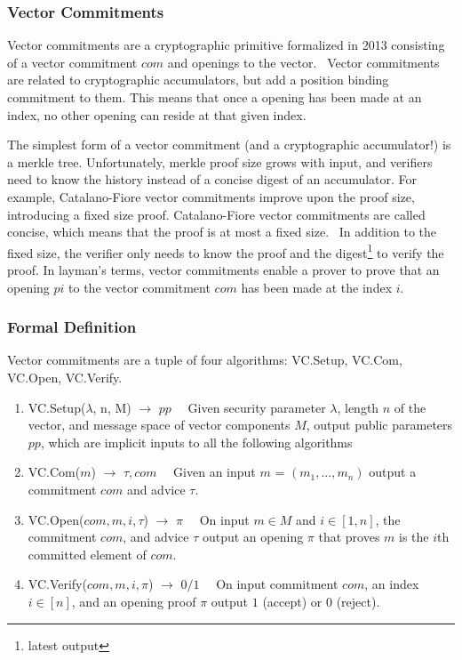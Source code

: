 \subsubsection{Vector Commitments}
Vector commitments are a cryptographic primitive formalized in 2013 consisting of a vector commitment \(com\) and openings to the vector.~\cite{Catalano2013-jn} Vector commitments are related to cryptographic accumulators, but add a position binding commitment to them. This means that once a opening has been made at an index, no other opening can reside at that given index.

The simplest form of a vector commitment (and a cryptographic accumulator!) is a merkle tree. Unfortunately, merkle proof size grows with input, and verifiers need to know the history instead of a concise digest of an accumulator. For example, Catalano-Fiore vector commitments improve upon the proof size, introducing a fixed size proof. Catalano-Fiore vector commitments are called concise, which means that the proof is at most a fixed size.~\cite{Catalano2013-jn} In addition to the fixed size, the verifier only needs to know the proof and the digest\footnote{latest output} to verify the proof. In layman's terms, vector commitments enable a prover to prove that an opening \(pi\) to the vector commitment \(com\) has been made at the index \(i\).

\subsubsection{Formal Definition}
Vector commitments are a tuple of four algorithms: VC.Setup, VC.Com, VC.Open, VC.Verify.~\cite{Boneh2019-tk}

\begin{enumerate}

  \item VC.Setup(\(\lambda\), n, M) \(\rightarrow\) \(pp\quad\) Given security parameter \(\lambda\), length \(n\) of the vector, and message space of vector components \(M\), output public parameters \(pp\), which are implicit inputs to all the following algorithms

  \item VC.Com(\(m\)) \(\rightarrow\) \(\tau, com\quad\) Given an input \(m\) = \((m_1, ..., m_n)\) output a commitment \(com\) and advice \(\tau\).

  \item VC.Open(\(com, m, i, \tau\)) \(\rightarrow\) \(\pi\quad\) On input \(m \in M\) and \(i \in [1, n]\), the commitment \(com\), and advice \(\tau\) output an opening \(\pi\) that proves \(m\) is the \(i\)th committed element of \(com\).

  \item VC.Verify(\(com, m, i, \pi\)) \(\rightarrow\) \(0/1\quad\) On input commitment \(com\), an index \(i \in [n]\), and an opening proof \(\pi\) output \(1\) (accept) or \(0\) (reject).

\end{enumerate}

